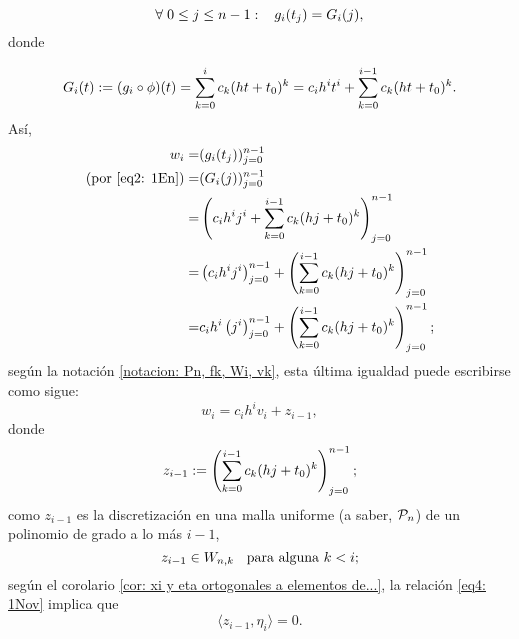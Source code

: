 \begin{itemize}
\begin{equation}
\label{eq2: 1En}
\forall \hspace{0.1cm} 0 \leq j \leq n-1: \hspace{0.3cm} g_{i}(t_{j})= G_{i}(j),
\end{equation}
donde

\[
G_{i}(t):= (g_{i} \circ \phi)(t) =
\sum\limits_{k=0}^{i}c_{k}(ht+t_{0})^{k}= c_{i}h^{i}t^{i}+
\sum\limits_{k=0}^{i-1}c_{k}(ht+t_{0})^{k}.
\]
Así, 
\begin{align*}
w_{i}= & (g_{i}(t_{j}))_{j=0}^{n-1} \\ 
\text{(por \eqref{eq2: 1En})} = & (G_{i}(j))_{j=0}^{n-1} \\
= & \left( c_{i}h^{i}j^{i}+
 \sum\limits_{k=0}^{i-1}c_{k}(hj+t_{0})^{k}\right)_{j=0}^{n-1}\\
 = & \left( c_{i}h^{i}j^{i}\right)_{j=0}^{n-1}
 +\left(\sum\limits_{k=0}^{i-1}c_{k}(hj+t_{0})^{k}\right)_{j=0}^{n-1} \\
  = & c_{i}h^{i}\left(j^{i}\right)_{j=0}^{n-1}
 +\left(\sum\limits_{k=0}^{i-1}c_{k}(hj+t_{0})^{k}\right)_{j=0}^{n-1};
\end{align*}
según la notación \ref{notacion: Pn, fk, Wi, vk}, esta
última igualdad puede escribirse como sigue:
\begin{equation}
\label{eq6: 1Nov}
w_{i}= c_{i}h^{i} v_{i}+ z_{i-1},
\end{equation}
donde 
\begin{equation*}
z_{i-1}:=\left(\sum\limits_{k=0}^{i-1}c_{k}(hj+t_{0})^{k}\right)_{j=0}^{n-1};
\end{equation*}
como $z_{i-1}$ es la discretización en una malla uniforme
(a saber, $\mathcal{P}_{n}$) de un polinomio de grado a lo más $i-1$, 
\begin{equation}
\label{eq4: 1Nov}
z_{i-1} \in W_{n,k} \hspace{0.2cm} \text{ para alguna } k < i;
\end{equation}
según el corolario \ref{cor: xi y eta ortogonales a elementos de...},
la relación \eqref{eq4: 1Nov} implica que
\begin{equation}
\label{eq5: 1Nov}
\langle z_{i-1}, \eta_{i} \rangle =0.
\end{equation}


\end{itemize}
